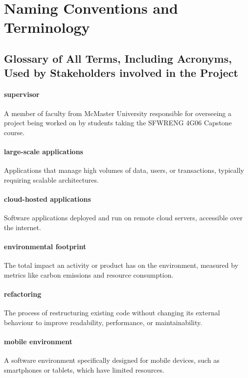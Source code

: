 \documentclass[12pt]{article}
\begin{document}
\section{Naming Conventions and Terminology}
\subsection{Glossary of All Terms, Including Acronyms, Used by Stakeholders
involved in the Project}

\paragraph*{supervisor}
A member of faculty from McMaster University responsible for overseeing a project being worked on by students taking the SFWRENG 4G06 Capstone course.

\paragraph*{large-scale applications}
Applications that manage high volumes of data, users, or transactions, typically requiring scalable architectures.

\paragraph*{cloud-hosted applications}
Software applications deployed and run on remote cloud servers, accessible over the internet.

\paragraph*{environmental footprint}
The total impact an activity or product has on the environment, measured by metrics like carbon emissions and resource consumption.

\paragraph*{refactoring}
The process of restructuring existing code without changing its external behaviour to improve readability, performance, or maintainability.

\paragraph*{mobile environment}
A software environment specifically designed for mobile devices, such as smartphones or tablets, which have limited resources.
\end{document}
